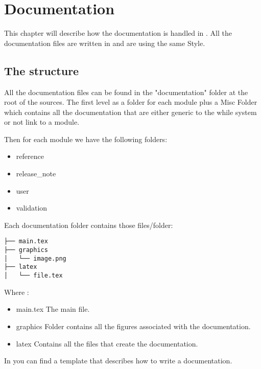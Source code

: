 \chapter{Documentation}

This chapter will describe how the documentation is handled in \telemacsystem.
All the documentation files are written in \latex and are using the same Style.

\section{The structure}
All the documentation files can be found in the "documentation" folder at the root of the \telemacsystem sources. The first level as a folder for each module plus a Misc Folder which contains all the documentation that are either generic to the while system or not link to a module.

Then for each module we have the following folders:
\begin{itemize}
\item reference
\item release_note
\item user
\item validation
\end{itemize}

Each documentation folder contains those files/folder:
\begin{verbatim}
├── main.tex
├── graphics
│   └── image.png
├── latex
│   └── file.tex
\end{verbatim}

Where :
\begin{itemize}
\item main.tex The main \latex file.
\item graphics Folder contains all the figures associated with the documentation.
\item latex Contains all the files that create the documentation.
\end{itemize}

In  you can find a template that describes how
to write a \telemacsystem documentation.

